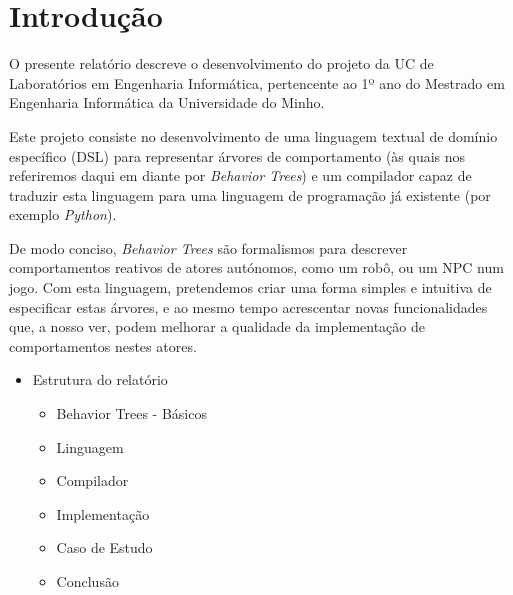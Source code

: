 
\chapter{Introdução} %

\label{Chapter1} %


\newcommand{\keyword}[1]{\textbf{#1}}
\newcommand{\tabhead}[1]{\textbf{#1}}
\newcommand{\code}[1]{\texttt{#1}}
\newcommand{\file}[1]{\texttt{\bfseries#1}}
\newcommand{\option}[1]{\texttt{\itshape#1}}


O presente relatório descreve o desenvolvimento do projeto da UC de Laboratórios em Engenharia Informática, pertencente ao 1º ano do Mestrado em Engenharia Informática da Universidade do Minho.

Este projeto consiste no desenvolvimento de uma linguagem textual de domínio específico (DSL) para representar árvores de comportamento (às quais nos referiremos daqui em diante por \textit{Behavior Trees}) e um compilador capaz de traduzir esta linguagem para uma linguagem de programação já existente (por exemplo \textit{Python}).

De modo conciso, \textit{Behavior Trees} são formalismos para descrever comportamentos reativos de atores autónomos, como um robô, ou um NPC num jogo.
Com esta linguagem, pretendemos criar uma forma simples e intuitiva de especificar estas árvores, e ao mesmo tempo acrescentar novas funcionalidades que, a nosso ver, podem melhorar a qualidade da implementação de comportamentos nestes atores.


\begin{itemize}
    \item Estrutura do relatório
    \begin{itemize}
        \item Behavior Trees - Básicos
        \item Linguagem
        \item Compilador
        \item Implementação
        \item Caso de Estudo
        \item Conclusão
    \end{itemize}

\end{itemize}

